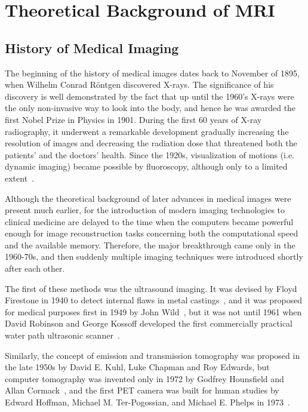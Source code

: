 \chapter{Theoretical Background of MRI}

\section{History of Medical Imaging}
The beginning of the history of medical images dates back to November of 1895, when Wilhelm Conrad Röntgen discovered X-rays. The significance of his discovery is well demonstrated by the fact that up until the 1960's X-rays were the only non-invasive way to look into the body, and hence he was awarded the first Nobel Prize in Physics in 1901. During the first 60 years of X-ray radiography, it underwent a remarkable development gradually increasing the resolution of images and decreasing the radiation dose that threatened both the patients' and the doctors' health. Since the 1920s, visualization of motions (i.e. dynamic imaging) became possible by fluoroscopy, although only to a limited extent~\cite{bradley_history_2008}.

Although the theoretical background of later advances in medical images were present much earlier, for the introduction of modern imaging technologies to clinical medicine are delayed to the time when the computers became powerful enough for image reconstruction tasks concerning both the computational speed and the available memory. Therefore, the major breakthrough came only in the 1960-70s, and then suddenly multiple imaging techniques were introduced shortly after each other.

The first of these methods was the ultrasound imaging. It was devised by Floyd Firestone in 1940 to detect internal flaws in metal castings~\cite{singh_origin_2007}, and it was proposed for medical purposes first in 1949 by John Wild~\cite{watts_john_2009}, but it was not until 1961 when David Robinson and George Kossoff developed the first commercially practical water path ultrasonic scanner~\cite{griffiths_historical_nodate}.

Similarly, the concept of emission and transmission tomography was proposed in the late 1950s by David E. Kuhl, Luke Chapman and Roy Edwards, but computer tomography was invented only in 1972 by Godfrey Hounsfield and Allan Cormack~\cite{richmond_sir_2004}, and the first PET camera was built for human studies by Edward Hoffman, Michael M. Ter-Pogossian, and Michael E. Phelps in 1973~\cite{noauthor_us_nodate}.

